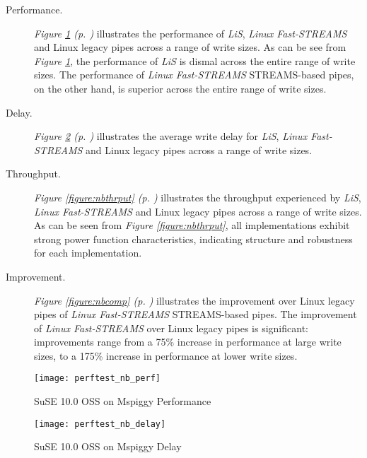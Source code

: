 \documentclass[letterpaper,final,notitlepage,twocolumn,10pt,twoside]{article}
\begin{document}
\begin{description}

\item[Performance.]
\textit{Figure \ref{figure:nbperf} (p. \pageref{figure:nbperf})} illustrates
the performance of \textsl{LiS}, \textsl{Linux Fast-STREAMS} and Linux legacy
pipes across a range of write sizes.
As can be see from \textit{Figure \ref{figure:nbperf}}, the performance of
\textsl{LiS} is dismal across the entire range of write sizes.  The
performance of \textsl{Linux Fast-STREAMS} STREAMS-based pipes, on the other
hand, is superior across the entire range of write sizes.

\item[Delay.]
\textit{Figure \ref{figure:nbdelay} (p. \pageref{figure:nbdelay})} illustrates
the average write delay for \textsl{LiS}, \textsl{Linux Fast-STREAMS} and
Linux legacy pipes across a range of write sizes.

\item[Throughput.]
\textit{Figure \ref{figure:nbthrput} (p. \pageref{figure:nbthrput})}
illustrates the throughput experienced by \textsl{LiS}, \textsl{Linux
Fast-STREAMS} and Linux legacy pipes across a range of write sizes.
As can be seen from \textit{Figure \ref{figure:nbthrput}}, all implementations
exhibit strong power function characteristics, indicating structure and
robustness for each implementation.

\item[Improvement.]
\textit{Figure \ref{figure:nbcomp} (p. \pageref{figure:nbcomp})} illustrates
the improvement over Linux legacy pipes of \textsl{Linux Fast-STREAMS}
STREAMS-based pipes.
The improvement of \textsl{Linux Fast-STREAMS} over Linux legacy pipes is
significant: improvements range from a 75\% increase in performance at large
write sizes, to a 175\% increase in performance at lower write sizes.

\end{description}

\begin{figure}[p]
\texttt{[image: perftest\_nb\_perf]}
\caption[SuSE 10.0 OSS on Mspiggy Performance]{SuSE 10.0 OSS on Mspiggy Performance}
\label{figure:nbperf}
\end{figure}

\begin{figure}[p]
\texttt{[image: perftest\_nb\_delay]}
\caption[SuSE 10.0 OSS on Mspiggy Delay]{SuSE 10.0 OSS on Mspiggy Delay}
\label{figure:nbdelay}
\end{figure}
\end{document}
